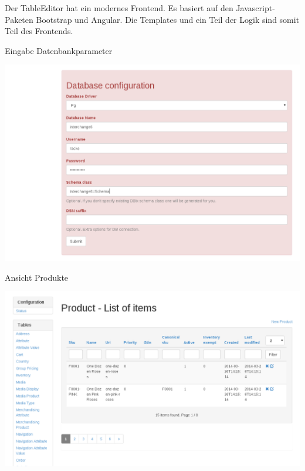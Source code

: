 Der TableEditor hat ein modernes Frontend. Es basiert
auf den Javascript-Paketen Bootstrap und Angular.
Die Templates und ein Teil der Logik sind somit Teil
des Frontends.


\begin{frame}{Eingabe Datenbankparameter}
  \begin{center}
    \includegraphics[width=\textwidth,height=0.8\textheight,keepaspectratio]{images/input.png}
  \end{center}
\end{frame}

\begin{frame}{Ansicht Produkte}
  \begin{center}
    \includegraphics[width=\textwidth,height=0.8\textheight,keepaspectratio]{images/product.png}
  \end{center}
\end{frame}

